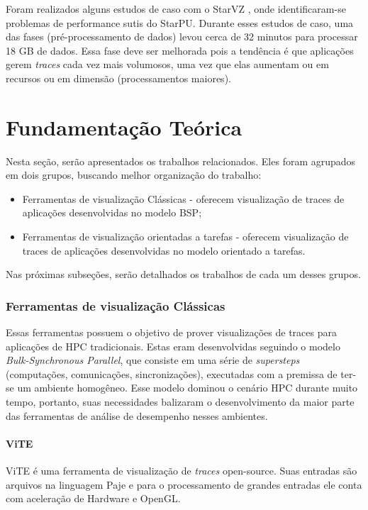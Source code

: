 \documentclass[prop-esp]{iiufrgs}
\begin{document}
Foram realizados alguns estudos de caso com o StarVZ \cite{ref:starvz}, onde identificaram-se problemas de performance sutis do StarPU. 
Durante esses estudos de caso, uma das fases (pré-processamento de dados) levou cerca de 32 minutos para processar 18 GB de dados. Essa fase deve ser melhorada pois a tendência é que aplicações gerem \emph{traces} cada vez mais volumosos, uma vez que elas aumentam ou em recursos ou em dimensão (processamentos maiores).


%
\chapter{Fundamentação Teórica}

Nesta seção, serão apresentados os trabalhos relacionados. Eles foram agrupados em dois grupos, buscando melhor organização do trabalho:

\begin{itemize}
\item Ferramentas de visualização Clássicas - oferecem visualização de traces de aplicações desenvolvidas no modelo BSP;
\item Ferramentas de visualização orientadas a tarefas - oferecem visualização de traces de aplicações desenvolvidas no modelo orientado a tarefas.
\end{itemize}

Nas próximas subseções, serão detalhados os trabalhos de cada um desses grupos.

\subsection*{Ferramentas de visualização Clássicas}

Essas ferramentas possuem o objetivo de prover visualizações de traces para aplicações de HPC tradicionais. Estas eram desenvolvidas
seguindo o modelo \emph{Bulk-Synchronous Parallel}, que consiste em uma série de \emph{supersteps} (computações, comunicações, sincronizações), 
executadas com a premissa de ter-se um ambiente homogêneo. Esse modelo dominou o cenário HPC durante muito tempo, portanto, suas necessidades
balizaram o desenvolvimento da maior parte das ferramentas de análise de desempenho nesses ambientes.

\subsubsection*{ViTE}
ViTE \cite{ref:vite} é uma ferramenta de visualização de \emph{traces} open-source. Suas entradas são arquivos na linguagem Paje \cite{} e para o processamento
de grandes entradas ele conta com aceleração de Hardware e OpenGL.
\end{document}
